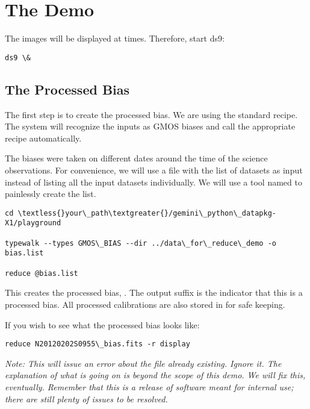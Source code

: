 \documentclass[letterpaper,10pt,english]{sphinxmanual}
\begin{document}
\section{The Demo}
\label{appendices/appendix_demo:the-demo}
The images will be displayed at times.  Therefore, start ds9:

\begin{Verbatim}[commandchars=\\\{\}]
ds9 \&
\end{Verbatim}


\subsection{The Processed Bias}
\label{appendices/appendix_demo:the-processed-bias}
The first step is to create the processed bias.  We are using the standard
recipe.  The system will recognize the inputs as GMOS biases and call the
appropriate recipe automatically.

The biases were taken on different dates
around the time of the science observations.  For convenience, we will use
a file with the list of datasets as input instead of listing all the input
datasets individually.  We will use a tool named  to painlessly
create the list.

\begin{Verbatim}[commandchars=\\\{\}]
cd \textless{}your\_path\textgreater{}/gemini\_python\_datapkg-X1/playground

typewalk --types GMOS\_BIAS --dir ../data\_for\_reduce\_demo -o bias.list

reduce @bias.list
\end{Verbatim}

This creates the processed bias, .  The output suffix
 is the indicator that this is a processed bias.  All processed calibrations
are also stored in  for safe keeping.

If you wish to see what the processed bias looks like:

\begin{Verbatim}[commandchars=\\\{\}]
reduce N20120202S0955\_bias.fits -r display
\end{Verbatim}

\emph{Note: This will issue an error about the file already existing.  Ignore it.
The explanation of what is going on is beyond the scope of this demo.  We
will fix this, eventually.  Remember that this is a release of software meant
for internal use; there are still plenty of issues to be resolved.}
\end{document}
